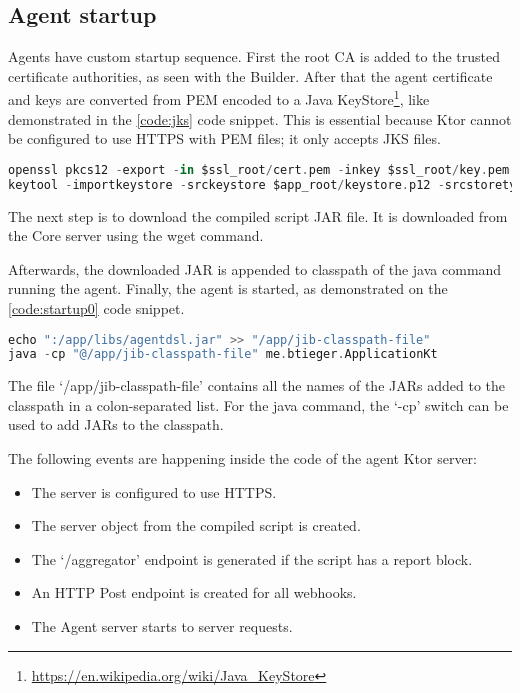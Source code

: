 \subsection{Agent startup}

Agents have custom startup sequence. First the root CA is added to the trusted certificate authorities, as seen with the Builder. After that the agent certificate and keys are converted from PEM encoded to a Java KeyStore\footnote{\url{https://en.wikipedia.org/wiki/Java_KeyStore}}, like demonstrated in the \ref{code:jks} code snippet. This is essential because Ktor cannot be configured to use HTTPS with PEM files; it only accepts JKS files.

\begin{lstlisting}[caption={From PEM to JKS transormation},language=Kotlin,label=code:jks]
openssl pkcs12 -export -in $ssl_root/cert.pem -inkey $ssl_root/key.pem -out $app_root/keystore.p12 -name "AgentCert" -password pass:$secret
keytool -importkeystore -srckeystore $app_root/keystore.p12 -srcstoretype pkcs12 -destkeystore /app/keystore.jks -deststorepass $secret -srcstorepass $secret
\end{lstlisting}

The next step is to download the compiled script JAR file. It is downloaded from the Core server using the wget command. 

Afterwards, the downloaded JAR is appended to classpath of the java command running the agent. Finally, the agent is started, as demonstrated on the \ref{code:startup0} code snippet.

\begin{lstlisting}[caption={Starting the agent JAR},language=Kotlin,label=code:startup0]
echo ":/app/libs/agentdsl.jar" >> "/app/jib-classpath-file"
java -cp "@/app/jib-classpath-file" me.btieger.ApplicationKt
\end{lstlisting}

The file `/app/jib-classpath-file' contains all the names of the JARs added to the classpath in a colon-separated list. For the java command, the `-cp' switch can be used to add JARs to the classpath.

The following events are happening inside the code of the agent Ktor server:

\begin{itemize}
    \item The server is configured to use HTTPS.
    \item The server object from the compiled script is created.
    \item The `/aggregator' endpoint is generated if the script has a report block.
    \item An HTTP Post endpoint is created for all webhooks.
    \item The Agent server starts to server requests.
\end{itemize}


